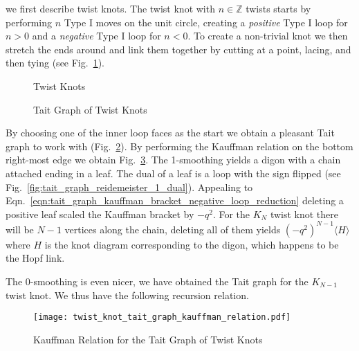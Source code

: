             we first describe twist knots. The twist knot with $n\in\mathbb{Z}$
            twists starts by performing $n$ Type I moves on the unit circle,
            creating a \textit{positive} Type I loop for $n>0$ and a
            \textit{negative} Type I loop for $n<0$. To create a non-trivial
            knot we then stretch the ends around and link them together by
            cutting at a point, lacing, and then tying
            (see Fig.~\ref{fig:twist_knot_001}).
            \begin{figure}
                \centering
                \caption{Twist Knots}
                \label{fig:twist_knot_001}
            \end{figure}
            \begin{figure}
                \centering
                \caption{Tait Graph of Twist Knots}
                \label{fig:twist_knot_tait_graph_001}
            \end{figure}
            By choosing one of the inner loop faces as the start we obtain a
            pleasant Tait graph to work with
            (Fig.~\ref{fig:twist_knot_tait_graph_001}). By performing the
            Kauffman relation on the bottom right-most edge we obtain
            Fig.~\ref{fig:twist_knot_tait_graph_kauffman_relation}. The
            1-smoothing yields a digon with a chain attached ending in a leaf.
            The dual of a leaf is a loop with the sign flipped
            (see Fig.~\ref{fig:tait_graph_reidemeister_1_dual}).
            Appealing to
            Eqn.~\ref{eqn:tait_graph_kauffman_bracket_negative_loop_reduction}
            deleting a positive leaf scaled the Kauffman bracket by
            $-q^{2}$. For the $K_{N}$ twist knot there will be
            $N-1$ vertices along the chain, deleting all of them yields
            $(-q^{2})^{N-1}\langle{H}\rangle$ where $H$ is the knot diagram
            corresponding to the digon, which happens to be the Hopf link.
            \par\hfill\par
            The 0-smoothing is even nicer, we have obtained the Tait graph for
            the $K_{N-1}$ twist knot. We thus have the following recursion
            relation.
            \begin{figure}
                \centering
                \texttt{[image: twist\_knot\_tait\_graph\_kauffman\_relation.pdf]}
                \caption{Kauffman Relation for the Tait Graph of Twist Knots}
                \label{fig:twist_knot_tait_graph_kauffman_relation}
            \end{figure}
